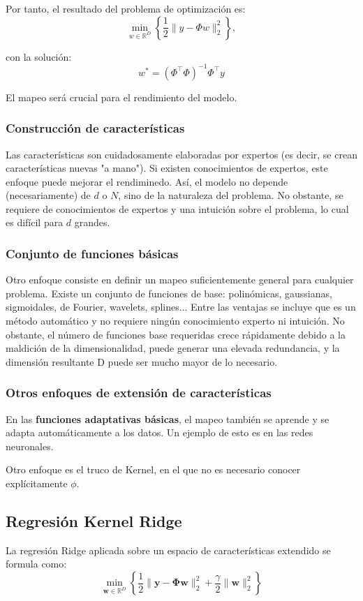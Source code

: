 Por tanto, el resultado del problema de optimización es:
$$\min_{w \in \mathbb{R}^D} \left\{ \frac{1}{2} \|y - \Phi w\|_2^2 \right\},$$

con la solución:
$$w^* = (\Phi^\top \Phi)^{-1} \Phi^\top y$$

El mapeo será crucial para el rendimiento del modelo.

\subsubsection{Construcción de características}
Las características son cuidadosamente elaboradas por expertos (es decir, se crean características nuevas "a mano"). Si existen conocimientos de expertos, este enfoque puede mejorar el rendiminedo. Así, el modelo no depende (necesariamente) de $d$ o $N$, sino de la naturaleza del problema. No obstante, se requiere de conocimientos de expertos y una intuición sobre el problema, lo cual es difícil para $d$ grandes.

\subsubsection{Conjunto de funciones básicas}
Otro enfoque consiste en definir un mapeo suficientemente general para cualquier problema. Existe un conjunto de funciones de base: polinómicas, gaussianas, sigmoidales, de Fourier, wavelets, splines...
Entre las ventajas se incluye que es un método automático y no requiere ningún conocimiento experto ni intuición. No obstante, el número de funciones base requeridas crece rápidamente debido a la maldición de la dimensionalidad, puede generar una elevada redundancia, y la dimensión resultante D puede ser mucho mayor de lo necesario.

\subsubsection{Otros enfoques de extensión de características}
En las \textbf{funciones adaptativas básicas}, el mapeo también se aprende y se adapta automáticamente a los datos. Un ejemplo de esto es en las redes neuronales.

Otro enfoque es el truco de Kernel, en el que no es necesario conocer explícitamente $\phi$.

\subsection{Regresión Kernel Ridge}
La regresión Ridge aplicada sobre un espacio de características extendido se formula como:
$$\min_{\mathbf{w}\in\mathbb{R}^{D}}\left\{\frac{1}{2}\|\mathbf{y}-\mathbf{\Phi}\mathbf{w}\|_{2}^{2}+\frac{\gamma}{2}\|\mathbf{w}\|_{2}^{2}\right\}$$

